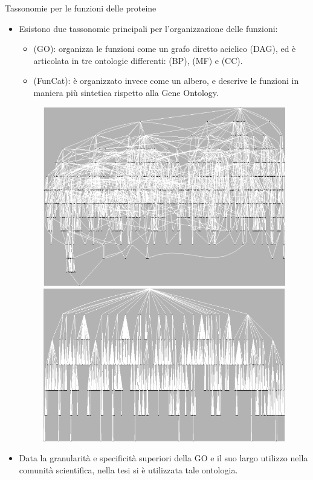 \documentclass[9pt]{beamer}
\begin{document}
\begin{tframe}{Tassonomie per le funzioni delle proteine}
\begin{itemize}
\item Esistono due tassonomie principali per l'organizzazione delle funzioni:
\begin{itemize}

\item {} (GO): organizza le funzioni come un grafo diretto aciclico (DAG), ed è articolata in tre ontologie differenti:  (BP),  (MF) e  (CC). 
\item {} (FunCat): è organizzato invece come un albero, e descrive le funzioni in maniera più sintetica rispetto alla Gene Ontology.
\end{itemize}
\begin{figure}[h]
\center
\includegraphics[scale=0.15]{./img/GO.png}
\includegraphics[scale=0.14]{./img/FunCat.png}
\label{DAGTREE}
\end{figure}
\item Data la granularità e specificità superiori della GO e il suo largo utilizzo nella comunità scientifica, nella tesi si è utilizzata tale ontologia.
\end{itemize}  
\end{tframe}
\end{document}
